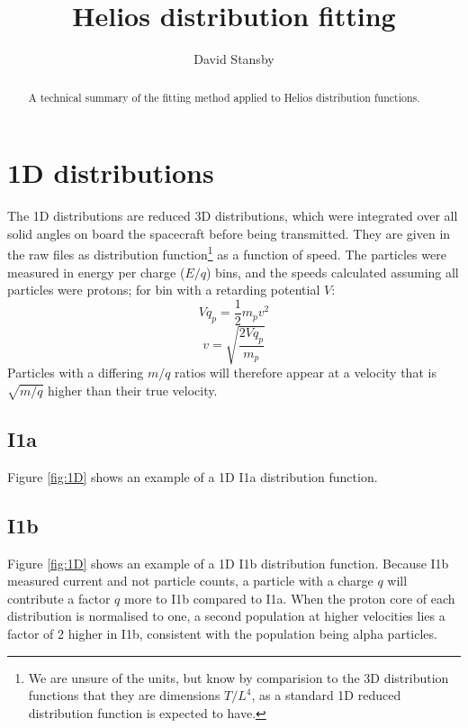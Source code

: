 \documentclass[11pt,a4paper]{article}
\begin{document}
\title{Helios distribution fitting}
\author{David Stansby}
\maketitle

\begin{abstract}
A technical summary of the fitting method applied to Helios distribution functions.
\end{abstract}
\section{1D distributions}
The 1D distributions are reduced 3D distributions, which were integrated over all solid angles on board the spacecraft before being transmitted. They are given in the raw files as distribution function\footnote{We are unsure of the units, but know by comparision to the 3D distribution functions that they are dimensions $T/L^{4}$, as a standard 1D reduced distribution function is expected to have.} as a function of speed. The particles were measured in energy per charge ($E/q$) bins, and the speeds calculated assuming all particles were protons; for bin with a retarding potential $V$:
\begin{equation}
	Vq_{p} = \frac{1}{2} m_{p} v^{2}
\end{equation}
\begin{equation}
	v = \sqrt{\frac{2 Vq_{p}}{m_{p}}}
\end{equation}
Particles with a differing $m/q$ ratios will therefore appear at a velocity that is $\sqrt{m/q}$ higher than their true velocity.

\subsection{I1a}
Figure \ref{fig:1D} shows an example of a 1D I1a distribution function.

\subsection{I1b}
Figure \ref{fig:1D} shows an example of a 1D I1b distribution function. Because I1b measured current and not particle counts, a particle with a charge $q$ will contribute a factor $q$ more to I1b compared to I1a. When the proton core of each distribution is normalised to one, a second population at higher velocities lies a factor of 2 higher in I1b, consistent with the population being alpha particles.
\end{document}
